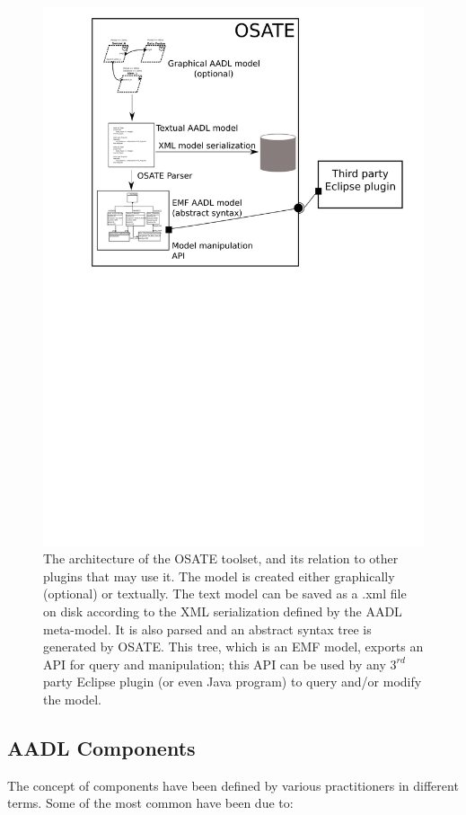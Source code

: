 \begin{figure}
\centering
\includegraphics[scale=0.9]{figs/osate_arch}
\caption{The architecture of the OSATE toolset, and its relation to
  other plugins that may use it. The model is created either
  graphically (optional) or textually. The text model can be saved as
  a .xml file on disk according to the XML serialization defined by
  the AADL meta-model. It is also parsed and an abstract syntax tree
  is generated by OSATE. This tree, which is an EMF model, exports an
  API for query and manipulation; this API can be used by any $3^{rd}$
  party Eclipse plugin (or even Java program) to query and/or modify
  the model.}
\label{fig:osate_arch}
\end{figure}

\subsection{AADL Components}
The concept of components have been defined by various practitioners
in different terms. Some of the most common have been due to:

